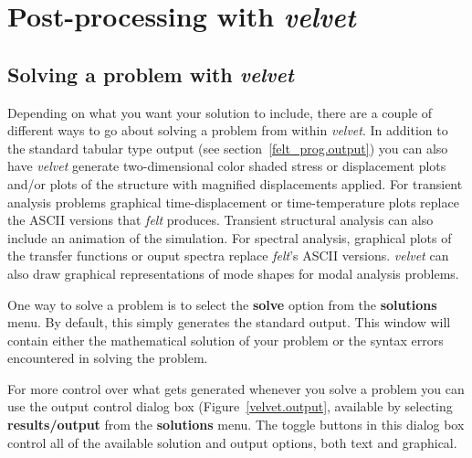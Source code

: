 
\newpage{\pagestyle{empty}\cleardoublepage}

\chapter{Post-processing with {\em velvet}}
\label{velvet.solve}

\section{Solving a problem with {\em velvet}}

Depending on what you want your solution to include, there are a couple
of different ways to go about solving a \felt{} problem from within
{\em velvet}.  In addition to the standard tabular type \felt{} output (see 
section~\ref{felt_prog.output}) you can also have {\em velvet} generate
two-dimensional color shaded stress or displacement plots and/or plots 
of the structure with magnified displacements applied.  For transient 
analysis problems graphical time-displacement or time-temperature plots replace 
the ASCII versions that {\em felt} produces.  Transient structural analysis can 
also include an animation of the simulation.  For spectral analysis, graphical 
plots of the transfer functions or ouput spectra replace {\em felt}'s ASCII 
versions.  {\em velvet} can also draw graphical representations of mode shapes 
for modal analysis problems.

One way to solve a problem is to select the {\bf solve} option from the
{\bf solutions} menu.  By default, this simply generates the standard \felt{} 
output. This window will contain either the mathematical solution of
your problem or the syntax errors encountered in solving the problem.

For more control over what gets generated whenever you solve a problem
you can use the output control dialog box (Figure~\ref{velvet.output}, 
available by selecting {\bf results/output} from the {\bf solutions} menu.  
The toggle buttons in this dialog box control all of the available
solution and output options, both text and graphical.   

